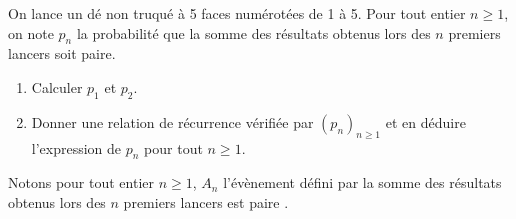 \documentclass[a4paper,10pt]{report}
\begin{document}
\begin{Exercice}{} On lance un dé non truqué à 5 faces numérotées de 1 à 5. Pour tout entier $n \geq 1$, on note $p_n$ la probabilité que la somme des résultats obtenus lors des $n$ premiers lancers soit paire. 
\begin{enumerate}
\item Calculer $p_1$ et $p_2$.
\item Donner une relation de récurrence vérifiée par $(p_n)_{n \geq 1}$ et en déduire l'expression de $p_n$ pour tout $n \geq 1$.
\end{enumerate}
\end{Exercice}

\corr Notons pour tout entier $n \geq 1$, $A_n$ l'évènement défini par \og la somme des résultats obtenus lors des $n$ premiers lancers est paire \fg .
\end{document}
